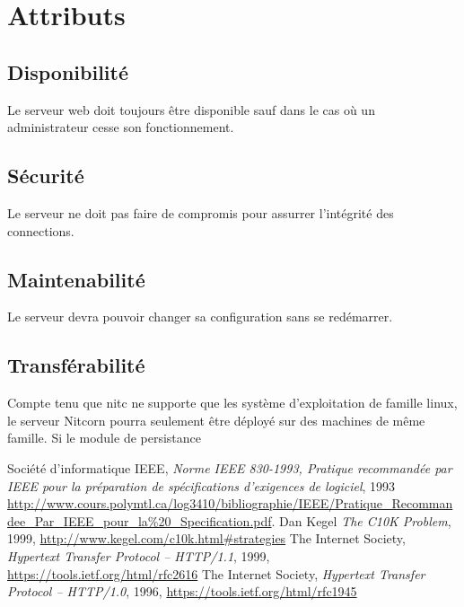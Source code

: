 \documentclass{scrreprt}
\begin{document}
\section{Attributs}
\subsection{Disponibilité}
Le serveur web doit toujours être disponible sauf dans le cas où un administrateur cesse son fonctionnement.
\subsection{Sécurité}
Le serveur ne doit pas faire de compromis pour assurrer l'intégrité des connections.
\subsection{Maintenabilité}
Le serveur devra pouvoir changer sa configuration sans se redémarrer.
\subsection{Transférabilité} Compte tenu que nitc ne supporte que les système d'exploitation de famille linux, le serveur Nitcorn pourra seulement être déployé
sur des machines de même famille. Si le module de persistance 


\begin{thebibliography}{9}
  Société d'informatique IEEE,
\emph{Norme IEEE 830-1993, Pratique recommandée par IEEE pour la préparation de
spécifications d’exigences de logiciel}, 1993
\url{http://www.cours.polymtl.ca/log3410/bibliographie/IEEE/Pratique_Recommandee_Par_IEEE_pour_la%20_Specification.pdf}.
  Dan Kegel
\emph{The C10K Problem}, 1999, \url{http://www.kegel.com/c10k.html#strategies}
    The Internet Society,
\emph{Hypertext Transfer Protocol -- HTTP/1.1}, 1999,
\url{https://tools.ietf.org/html/rfc2616}
    The Internet Society,
\emph{Hypertext Transfer Protocol -- HTTP/1.0}, 1996,
\url{https://tools.ietf.org/html/rfc1945}
\end{thebibliography}

\end{document}
